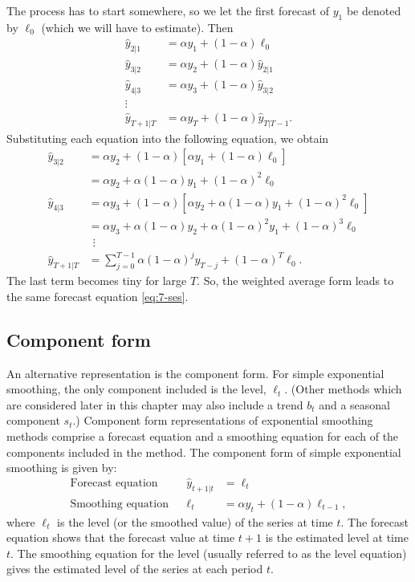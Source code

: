 \documentclass[]{book}
\begin{document}
The process has to start somewhere, so we let the first forecast of \(y_1\) be denoted by \(\ell_0\) (which we will have to estimate). Then
\begin{align*}
  \hat{y}_{2|1} &= \alpha y_1 + (1-\alpha) \ell_0\\
  \hat{y}_{3|2} &= \alpha y_2 + (1-\alpha) \hat{y}_{2|1}\\
  \hat{y}_{4|3} &= \alpha y_3 + (1-\alpha) \hat{y}_{3|2}\\
  \vdots\\
  \hat{y}_{T+1|T} &= \alpha y_T + (1-\alpha) \hat{y}_{T|T-1}.
\end{align*}
Substituting each equation into the following equation, we obtain
\begin{align*}
  \hat{y}_{3|2}   & = \alpha y_2 + (1-\alpha) \left[\alpha y_1 + (1-\alpha) \ell_0\right]              \\
                 & = \alpha y_2 + \alpha(1-\alpha) y_1 + (1-\alpha)^2 \ell_0                          \\
  \hat{y}_{4|3}   & = \alpha y_3 + (1-\alpha) [\alpha y_2 + \alpha(1-\alpha) y_1 + (1-\alpha)^2 \ell_0]\\
                 & = \alpha y_3 + \alpha(1-\alpha) y_2 + \alpha(1-\alpha)^2 y_1 + (1-\alpha)^3 \ell_0 \\
                 & ~~\vdots                                                                           \\
  \hat{y}_{T+1|T} & =  \sum_{j=0}^{T-1} \alpha(1-\alpha)^j y_{T-j} + (1-\alpha)^T \ell_{0}.
\end{align*}
The last term becomes tiny for large \(T\). So, the weighted average form leads to the same forecast equation \eqref{eq:7-ses}.

\hypertarget{component-form}{%
\subsection*{Component form}\label{component-form}}

An alternative representation is the component form. For simple exponential smoothing, the only component included is the level, \(\ell_t\). (Other methods which are considered later in this chapter may also include a trend \(b_t\) and a seasonal component \(s_t\).) Component form representations of exponential smoothing methods comprise a forecast equation and a smoothing equation for each of the components included in the method. The component form of simple exponential smoothing is given by:
\begin{align*}
  \text{Forecast equation}  && \hat{y}_{t+1|t} & = \ell_{t}\\
  \text{Smoothing equation} && \ell_{t}        & = \alpha y_{t} + (1 - \alpha)\ell_{t-1},
\end{align*}
where \(\ell_{t}\) is the level (or the smoothed value) of the series at time \(t\). The forecast equation shows that the forecast value at time \(t+1\) is the estimated level at time \(t\). The smoothing equation for the level (usually referred to as the level equation) gives the estimated level of the series at each period \(t\).
\end{document}
